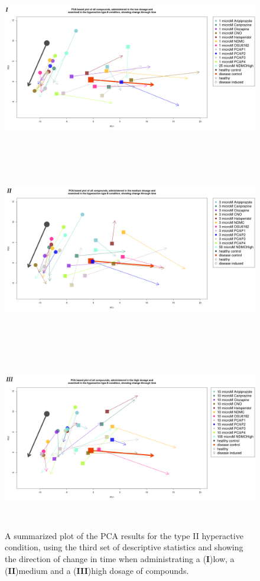 \documentclass[a4paper,12pt]{article}
\begin{document}
\begin{figure}[h!]
\begin{center}
\includegraphics[width=16cm,height=8cm]{All_together_1_microM_DarkPTZ_in_time_set3.png}
\includegraphics[width=16cm,height=8cm]{All_together_3_microM_DarkPTZ_in_time_set3.png}
\end{center}
\end{figure}
\newpage
\begin{figure}[h!]
\begin{center}
\includegraphics[width=16cm,height=8cm]{All_together_10_microM_DarkPTZ_in_time_set3.png}
\caption{A summarized plot of the PCA results for the type II hyperactive condition, using the third set of descriptive statistics and showing the direction of change in time when administrating a (\textbf{I})low, a (\textbf{II})medium and a (\textbf{III})high dosage of compounds.}
\end{center}
\end{figure}
\end{document}
